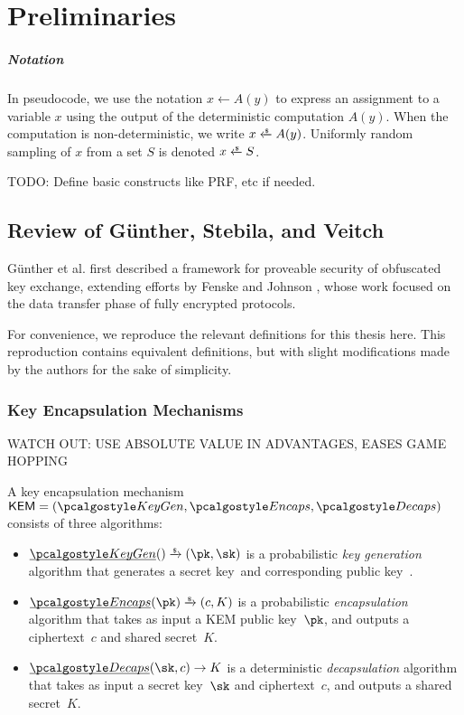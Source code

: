 \chapter{Preliminaries}\label{ch:preliminaries}

\paragraph{Notation}
In pseudocode, we use the notation $x \gets A(y)$ to express an assignment to a variable $x$ using the output of the deterministic computation $A(y)$. When the computation is non-deterministic, we write $x \getsr A(y)$.
Uniformly random sampling of $x$ from a set $S$ is denoted $x \getsr S$.

TODO: Define basic constructs like PRF, etc if needed.

\section{\texorpdfstring{Review of Günther, Stebila, and Veitch \cite{CCS:GunSteVei24}}{Review of Günther, Stebila, and Veitch}} \label{sec:review-gsv24}

Günther et al. first described a framework for proveable security of obfuscated key exchange, extending efforts by Fenske and Johnson \cite{CCS:FenJoh24}, whose work focused on the data transfer phase of fully encrypted protocols.

For convenience, we reproduce the relevant definitions for this thesis here. This reproduction contains equivalent definitions, but with slight modifications made by the authors for the sake of simplicity.

\subsection{Key Encapsulation Mechanisms}

WATCH OUT: USE ABSOLUTE VALUE IN ADVANTAGES, EASES GAME HOPPING

\begin{definition}
    \label{def:kem}
    A key encapsulation mechanism $\KEM = (\kgen,\encaps, \decaps)$ consists of three algorithms:
    \begin{itemize}
        \item $\ul{\kgen}() \tor (\pk, \sk)$
        is a probabilistic \emph{key generation} algorithm that generates a secret key~\sk and corresponding public key~\pk.
        \item $\ul{\encaps}(\pk) \tor (c, K)$
        is a probabilistic \emph{encapsulation} algorithm that takes as input a KEM public key~$\pk$, and outputs a ciphertext~$c$ and shared secret~$K$.
        \item $\ul{\decaps}(\sk, c) \to K$
        is a deterministic \emph{decapsulation} algorithm that takes as input a secret key~$\sk$ and ciphertext~$c$, and outputs a shared secret~$K$.
    \end{itemize}
\end{definition}

